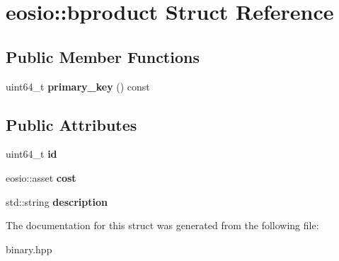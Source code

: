 \hypertarget{structeosio_1_1bproduct}{}\section{eosio\+:\+:bproduct Struct Reference}
\label{structeosio_1_1bproduct}
\subsection*{Public Member Functions}
\begin{DoxyCompactItemize}
\item 
\mbox{\label{structeosio_1_1bproduct_a8ae70ef2def908782b27f9b07313e54a}} 
uint64\+\_\+t {\bfseries primary\+\_\+key} () const
\end{DoxyCompactItemize}
\subsection*{Public Attributes}
\begin{DoxyCompactItemize}
\item 
\mbox{\label{structeosio_1_1bproduct_a0e7f5bef5a448f14c2bfbe999a5c9be9}} 
uint64\+\_\+t {\bfseries id}
\item 
\mbox{\label{structeosio_1_1bproduct_a24dcbfdaa348748c57a562cd0e8f9d27}} 
eosio\+::asset {\bfseries cost}
\item 
\mbox{\label{structeosio_1_1bproduct_aea0c792d87674e58acdba28aa453dcb7}} 
std\+::string {\bfseries description}
\end{DoxyCompactItemize}


The documentation for this struct was generated from the following file\+:\begin{DoxyCompactItemize}
\item 
binary.\+hpp\end{DoxyCompactItemize}
